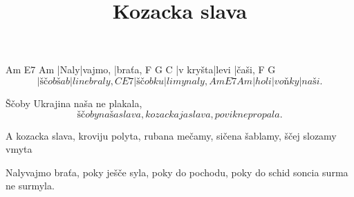 \documentclass{song}
\title{Kozacka slava}
\begin{document}
\strophe
Am   E7      Am
|Naly|vajmo, |braťa,
F        G     C
|v kryšta|levi |čaši,
   F        G
\[ |ščob šab|li ne braly,
C       E7
|ščob ku|li mynaly,
Am   E7     Am
|holi|voňky |naši. \]
\endstrophe

\strophe*
Ščoby Ukrajina
naša ne plakala,
\[ ščoby naša slava,
kozackaja slava,
povik ne propala.\]
\endstrophe

\strophe*
A kozacka slava,
kroviju polyta,
rubana mečamy,
sičena šablamy,
ščej slozamy vmyta
\endstrophe

\strophe*
Nalyvajmo braťa,
poky ješče syla,
poky do pochodu,
poky do schid soncia
surma ne surmyla.
\endstrophe
\end{document}
